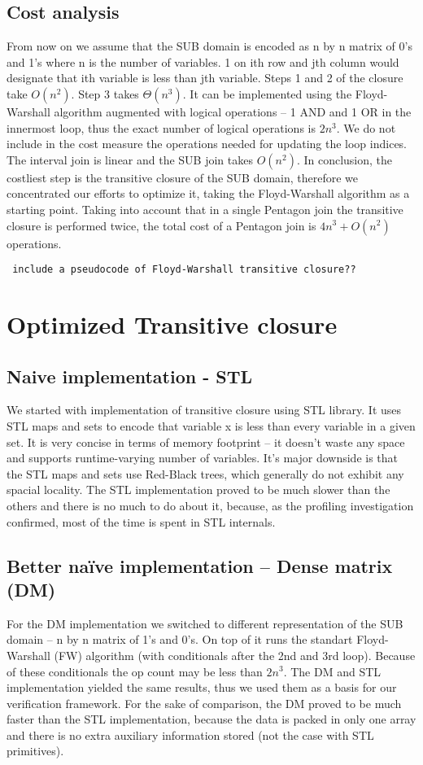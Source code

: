 \documentclass[letterpaper]{article}
\begin{document}
\subsection{Cost analysis}
From now on we assume that the SUB domain is encoded as n by n matrix of 0's and 1's 
where n is the number of variables. 1 on ith row and jth column would designate 
that ith variable is less than jth variable. Steps 1 and 2 of the closure 
take \(O(n^2)\). Step 3 takes \(\Theta(n^3)\). It can be implemented using the Floyd-Warshall 
algorithm \cite{Floyd1962} augmented with logical operations – 1 AND and 1 OR in the innermost 
loop, thus the exact number of logical operations is \(2n^3\). We do not include in the cost measure
the operations needed for updating the loop indices. The interval join is 
linear and the SUB join takes \(O(n^2)\). In conclusion, the costliest step is 
the transitive closure of the SUB domain, therefore we concentrated our efforts 
to optimize it, taking the Floyd-Warshall algorithm as a starting point. 
Taking into account that in a single Pentagon join the transitive closure is 
performed twice, the total cost of a Pentagon join is \(4n^3 + O(n^2)\) operations.

\texttt{ include a pseudocode of Floyd-Warshall transitive closure?? }

\section{Optimized Transitive closure}\label{sec:yourmethod}


\subsection{Naive implementation - STL}
We started with implementation of transitive closure using STL library. 
It uses STL maps and sets to encode that variable x is less than every 
variable in a given set. It is very concise in terms of memory 
footprint -- it doesn't waste any space and supports runtime-varying 
number of variables. It's major downside is that the STL maps and sets 
use Red-Black trees, which generally do not exhibit any spacial locality. 
The STL implementation proved to be much slower than the others and there 
is no much to do about it, because, as the profiling investigation 
confirmed, most of the time is spent in STL internals.

\subsection{Better na\"ive implementation – Dense matrix (DM)}
For the DM implementation we switched to different representation of the 
SUB domain – n by n matrix of 1's and 0's. On top of it runs the standart 
Floyd-Warshall (FW) algorithm (with conditionals after the 2nd and 3rd loop). 
Because of these conditionals the op count may be less than \(2n^3\). The DM 
and STL implementation yielded the same results, thus we used them as a 
basis for our verification framework. For the sake of comparison, the DM 
proved to be much faster than the STL implementation, because the data is 
packed in only one array and there is no extra auxiliary information stored (not the case with STL primitives).
\end{document}
